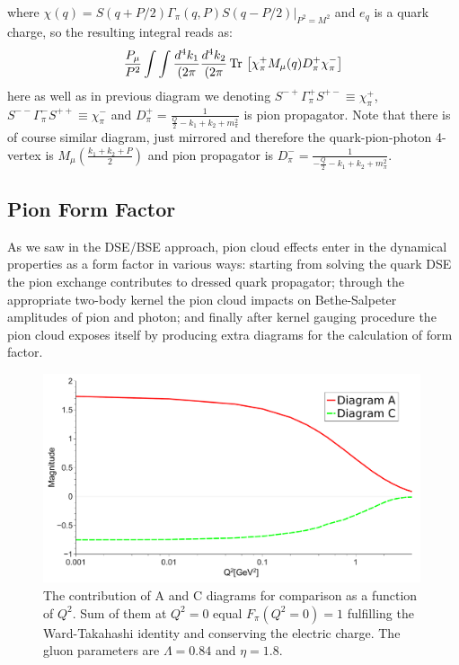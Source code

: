 where $\chi(q) = S(q+P/2)\Gamma_{\pi}(q,P)S(q-P/2) |_{P^2=M^2}$ and $e_q$ is a quark charge, so the resulting integral reads as:
\begin{equation}
\begin{array}{c}
\displaystyle \frac{P_{\mu}}{P^2} \int\int \frac{d^4k_1}{(2\pi} \frac{d^4k_2}{(2\pi} \,\mathrm{Tr}\, \left[  \chi_{\pi}^{+} M_\mu(q) D_{\pi}^{+} \chi_{\pi}^{-} \right] 
\end{array}
\label{Diargam_C}
\end{equation} 
here as well as in previous diagram we denoting $S^{-+}\Gamma_{\pi}^{+}S^{+-} \equiv \chi_{\pi}^{+}$, $S^{--}\Gamma_{\pi}^{-}S^{++} \equiv \chi_{\pi}^{-}$ and $D_{\pi}^{+} = \frac{1}{\frac{Q}{2} - k_1 + k_2 + m_{\pi}^2}$ is pion propagator. Note that there is of course similar diagram, just  mirrored and therefore the quark-pion-photon 4-vertex is $M_{\mu}(\frac{k_1 + k_2 + P}{2})$ and pion propagator is $D_{\pi}^{-} = \frac{1}{-\frac{Q}{2} - k_1 + k_2 + m_{\pi}^2}$.\\

\subsection*{Pion Form Factor}
As we saw in the DSE/BSE approach, pion cloud effects enter in the dynamical properties as a form factor in various ways: starting from solving the quark DSE the pion exchange contributes to dressed quark propagator; through the appropriate two-body kernel the pion cloud impacts on Bethe-Salpeter amplitudes of pion and photon; and finally after kernel gauging procedure the pion cloud exposes itself by producing extra diagrams for the calculation of form factor. 
\begin{figure}[!]
\centering
\includegraphics[width=0.99\textwidth]{figures/FF_A_C}
\caption{\label{fig:FF_A_C}\footnotesize The contribution of A and C diagrams for comparison as a function of $Q^2$. Sum of them at $Q^2=0$ equal $F_\pi(Q^2=0) = 1$ fulfilling the Ward-Takahashi identity and conserving the electric charge. The gluon parameters are $\Lambda=0.84$ and $\eta=1.8$.}
\end{figure} \\


